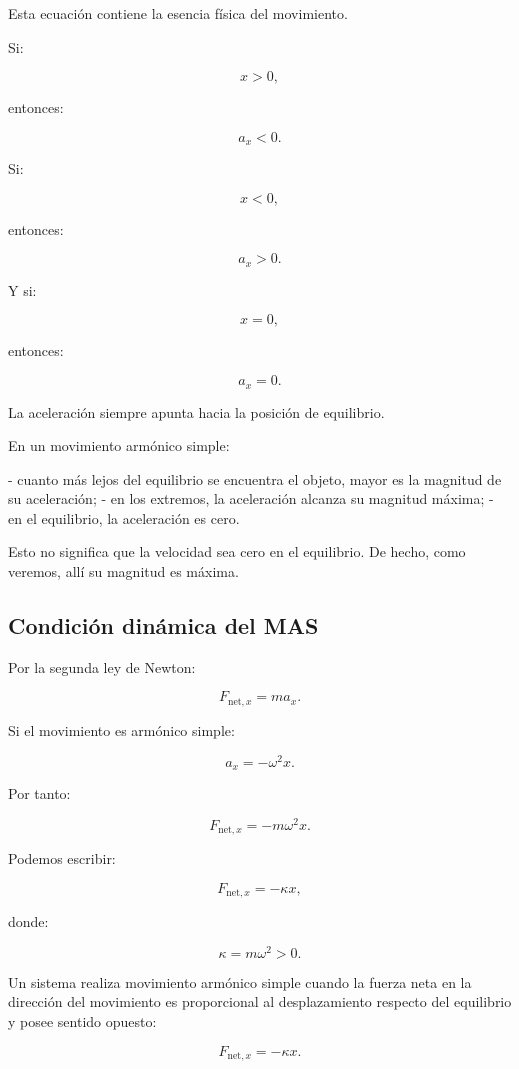 Esta ecuación contiene la esencia física del movimiento.

Si:

\[ x>0, \]

entonces:

\[ a_x<0. \]

Si:

\[ x<0, \]

entonces:

\[ a_x>0. \]

Y si:

\[ x=0, \]

entonces:

\[ a_x=0. \]

La aceleración siempre apunta hacia la posición de equilibrio.

\begin{interpretacion}
En un movimiento armónico simple:

- cuanto más lejos del equilibrio se encuentra el objeto, mayor es la magnitud de su aceleración;
- en los extremos, la aceleración alcanza su magnitud máxima;
- en el equilibrio, la aceleración es cero.

Esto no significa que la velocidad sea cero en el equilibrio. De hecho, como veremos, allí su magnitud es máxima.
\end{interpretacion}

\subsection{Condición dinámica del MAS}

Por la segunda ley de Newton:

\[ F_{\text{net},x}=ma_x. \]

Si el movimiento es armónico simple:

\[ a_x=-\omega^2x. \]

Por tanto:

\[ F_{\text{net},x}=-m\omega^2x. \]

Podemos escribir:

\[ \boxed{F_{\text{net},x}=-\kappa x}, \]

donde:

\[ \kappa=m\omega^2>0. \]

\begin{leyfisica}
Un sistema realiza movimiento armónico simple cuando la fuerza neta en la dirección del movimiento es proporcional al desplazamiento respecto del equilibrio y posee sentido opuesto:

\[ \boxed{F_{\text{net},x}=-\kappa x}. \]
\end{leyfisica}

